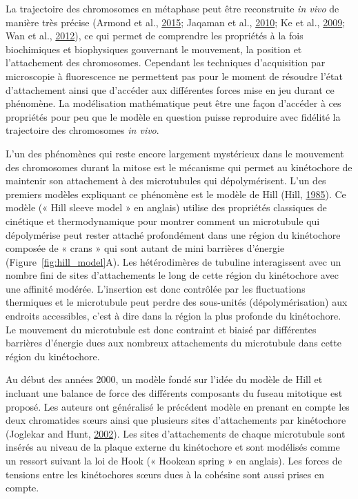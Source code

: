 \documentclass[12pt,a4paper,twoside,openright]{book}
\begin{document}
\label{sec:force-gen}

La trajectoire des chromosomes en métaphase peut être reconstruite
\emph{in vivo} de manière très précise (Armond et al.,
\hyperref[ref-Armond2015]{2015}; Jaqaman et al.,
\hyperref[ref-Jaqaman2010]{2010}; Ke et al.,
\hyperref[ref-Ke2009]{2009}; Wan et al., \hyperref[ref-Wan2012]{2012}),
ce qui permet de comprendre les propriétés à la fois biochimiques et
biophysiques gouvernant le mouvement, la position et l'attachement des
chromosomes. Cependant les techniques d'acquisition par microscopie à
fluorescence ne permettent pas pour le moment de résoudre l'état
d'attachement ainsi que d'accéder aux différentes forces mise en jeu
durant ce phénomène. La modélisation mathématique peut être une façon
d'accéder à ces propriétés pour peu que le modèle en question puisse
reproduire avec fidélité la trajectoire des chromosomes \emph{in vivo}.

L'un des phénomènes qui reste encore largement mystérieux dans le
mouvement des chromosomes durant la mitose est le mécanisme qui permet
au kinétochore de maintenir son attachement à des microtubules qui
dépolymérisent. L'un des premiers modèles expliquant ce phénomène est le
modèle de Hill (Hill, \hyperref[ref-Hill1985]{1985}). Ce modèle (« Hill
sleeve model » en anglais) utilise des propriétés classiques de
cinétique et thermodynamique pour montrer comment un microtubule qui
dépolymérise peut rester attaché profondément dans une région du
kinétochore composée de « crans » qui sont autant de mini barrières
d'énergie (Figure~\ref{fig:hill_model}A). Les hétérodimères de tubuline
interagissent avec un nombre fini de sites d'attachements le long de
cette région du kinétochore avec une affinité modérée. L'insertion est
donc contrôlée par les fluctuations thermiques et le microtubule peut
perdre des sous-unités (dépolymérisation) aux endroits accessibles,
c'est à dire dans la région la plus profonde du kinétochore. Le
mouvement du microtubule est donc contraint et biaisé par différentes
barrières d'énergie dues aux nombreux attachements du microtubule dans
cette région du kinétochore.

Au début des années 2000, un modèle fondé sur l'idée du modèle de Hill
et incluant une balance de force des différents composants du fuseau
mitotique est proposé. Les auteurs ont généralisé le précédent modèle en
prenant en compte les deux chromatides sœurs ainsi que plusieurs sites
d'attachements par kinétochore (Joglekar and Hunt,
\hyperref[ref-Joglekar2002]{2002}). Les sites d'attachements de chaque
microtubule sont insérés au niveau de la plaque externe du kinétochore
et sont modélisés comme un ressort suivant la loi de Hook (« Hookean
spring » en anglais). Les forces de tensions entre les kinétochores
sœurs dues à la cohésine sont aussi prises en compte.
\end{document}
